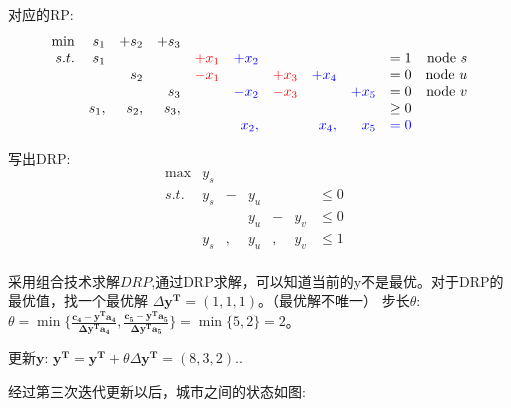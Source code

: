 \documentclass[11pt]{article}
\begin{document}
\begin{CJK}{UTF8}{gbsn}
对应的RP:
\[
\begin{array}{rrrrrrrrrrrrrrrrrl}
 \min & s_1 &+s_2 & +s_3 &     &        &    &     &   & \\
 s.t. & s_1 &     &     & \textcolor{red}{+x_1}  & \textcolor{blue}{+x_2} &    &     &   & = 1    & \text{node }s  \\
     &      &s_2     &             &  \textcolor{red}{-x_1}  &     & \textcolor{red}{+x_3}  &  \textcolor{blue}{+x_4}     &  & =  0  & \text{node }u\\
     &      &          & s_3       &     & \textcolor{blue}{-x_2}    & \textcolor{red}{-x_3}  &      & \textcolor{blue}{+x_5} & =  0 & \text{node }v \\
     & s_1, &s_2, &s_3,  &      &          &         &         &     & \geq 0 \\
     &         &       &         &    &    \textcolor{blue}{ x_2,} &      &   \textcolor{blue}{x_4,} & \textcolor{blue}{x_5} & \textcolor{blue}{= 0} \\ 	
\end{array} \nonumber
\]

写出DRP:
\[
\begin{array}{rrrrrrrrrl}
 \max & y_s   & &    \\
 s.t. & y_s &-& y_u  & &     &  \leq 0 &  \\
     &  & &   y_u   &-& y_v &  \leq 0 & \\
      & y_s &,& y_u  &,& y_v &  \leq 1 &  \\
\end{array} \nonumber
\]

采用组合技术求解$DRP$,通过DRP求解，可以知道当前的y不是最优。对于DRP的最优值，找一个最优解  $\Delta \mathbf{y^T} = (1, 1, 1)$。（最优解不唯一）
步长$\theta$: $\theta = \min \{
\frac{ \mathbf{c_4 - y^Ta_4} }{ \mathbf{\Delta y^T a_4}  } ,
\frac{ \mathbf{c_5 - y^Ta_5} }{ \mathbf{\Delta y^T a_5}  }
\} = \min\{ 5, 2 \} = 2$。

更新$\mathbf{y}$: $\mathbf{y^T=y^T}+\theta \Delta \mathbf{y^T}  = (8, 3, 2)$..

经过第三次迭代更新以后，城市之间的状态如图:
\begin{figure}[H]
\end{figure}
\end{CJK}
\end{document}
